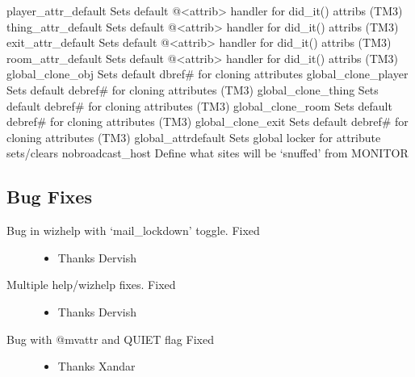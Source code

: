 \documentclass[letterpaper,10pt,english]{sphinxmanual}
\begin{document}
\sphinxAtStartPar
player\_attr\_default \sphinxhyphen{} Sets default @\textless{}attrib\textgreater{} handler for did\_it() attribs (TM3)
thing\_attr\_default \sphinxhyphen{} Sets default @\textless{}attrib\textgreater{} handler for did\_it() attribs (TM3)
exit\_attr\_default \sphinxhyphen{} Sets default @\textless{}attrib\textgreater{} handler for did\_it() attribs (TM3)
room\_attr\_default \sphinxhyphen{} Sets default @\textless{}attrib\textgreater{} handler for did\_it() attribs (TM3)
global\_clone\_obj \sphinxhyphen{} Sets default dbref\# for cloning attributes
global\_clone\_player \sphinxhyphen{} Sets default debref\# for cloning attributes (TM3)
global\_clone\_thing \sphinxhyphen{} Sets default debref\# for cloning attributes (TM3)
global\_clone\_room \sphinxhyphen{} Sets default debref\# for cloning attributes (TM3)
global\_clone\_exit \sphinxhyphen{} Sets default debref\# for cloning attributes (TM3)
global\_attrdefault \sphinxhyphen{} Sets global locker for attribute sets/clears
nobroadcast\_host \sphinxhyphen{} Define what sites will be ‘snuffed’ from MONITOR


\subsection{Bug Fixes}
\label{\detokenize{changelog:id17}}\begin{description}
\item[{Bug in wizhelp with ‘mail\_lockdown’ toggle.  \sphinxhyphen{} Fixed}] \leavevmode\begin{itemize}
\item {} 
\sphinxAtStartPar
Thanks Dervish

\end{itemize}

\item[{Multiple help/wizhelp fixes.  \sphinxhyphen{} Fixed}] \leavevmode\begin{itemize}
\item {} 
\sphinxAtStartPar
Thanks Dervish

\end{itemize}

\item[{Bug with @mvattr and QUIET flag \sphinxhyphen{} Fixed}] \leavevmode\begin{itemize}
\item {} 
\sphinxAtStartPar
Thanks Xandar

\end{itemize}

\end{description}
\end{document}
